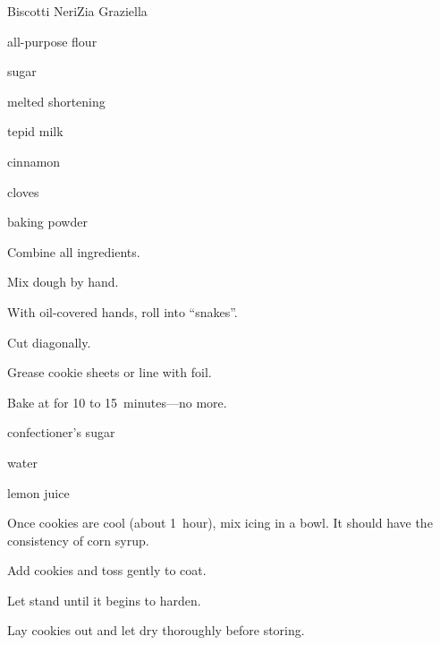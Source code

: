 \begin{recipe}{Biscotti Neri}{Zia Graziella}{}

\begin{ingredients}
\item {} all-purpose flour
\item {} sugar
\item \lbs{\half} melted shortening
\item {} tepid milk
\item {} 
\item {} cinnamon
\item {} cloves
\item {} baking powder
\end{ingredients}

\begin{directions}
\item Combine all ingredients.
\item Mix dough by hand.
\item With oil-covered hands, roll into ``snakes''.
\item Cut diagonally.
\item Grease cookie sheets or line with foil.
\item Bake at  for 10 to 15~minutes---no more.
\end{directions}


\begin{ingredients}
\item confectioner's sugar
\item water
\item lemon juice
\end{ingredients}

\begin{directions}
\item Once cookies are cool (about 1~hour), mix icing in a bowl. It should have the consistency of corn syrup.
\item Add cookies and toss gently to coat.
\item Let stand until it begins to harden.
\item Lay cookies out and let dry thoroughly before storing.
\end{directions}

\end{recipe}
